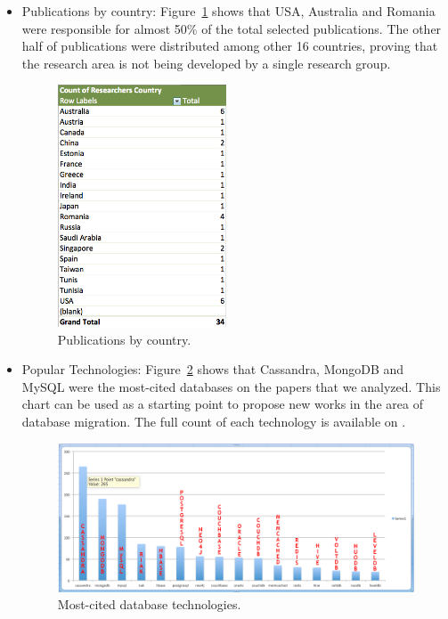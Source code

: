 \documentclass{article}
\begin{document}
\begin{itemize}
\item{Publications by country: }
Figure~\ref{fig:pubVsCountry} shows that USA, Australia and Romania were responsible for almost 50\% of the total selected publications. The other half of publications were distributed among other 16 countries, proving that the research area is not being developed by a single research group. 
\begin{figure}[htb!]
\centering
\includegraphics[width=50mm]{graph3.png}
\caption{Publications by country. \label{fig:pubVsCountry}}
\end{figure}



\item{Popular Technologies: }
Figure~\ref{fig:mostCitedDB} shows that Cassandra, MongoDB and MySQL were the most-cited databases on the papers that we analyzed. This chart can be used as a starting point to propose new works in the area of database migration. The full count of each technology is available on \cite{fullDBJson}.
\begin{figure}[htb!]
\centering
\includegraphics[width=120mm]{database_count_2.png}
\caption{Most-cited database technologies. \label{fig:mostCitedDB}}
\end{figure}


\end{itemize}
\end{document}
